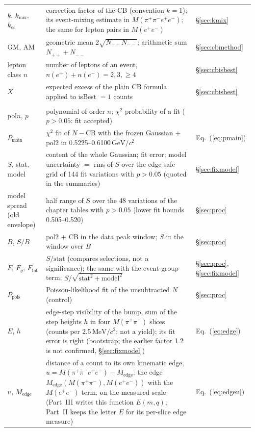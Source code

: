 \documentclass[11pt,a4paper]{article}
\newcommand{\Mfour}{\ensuremath{M(\pi^{+}\pi^{-}e^{+}e^{-})}\xspace}
\newcommand{\Mee}{\ensuremath{M(e^{+}e^{-})}\xspace}
\newcommand{\Mpipi}{\ensuremath{M(\pi^{+}\pi^{-})}\xspace}
\newcommand{\GeVcc}{\ensuremath{\mathrm{GeV}/c^{2}}\xspace}
\newcommand{\MeVcc}{\ensuremath{\mathrm{MeV}/c^{2}}\xspace}
\newcommand{\Pmain}{\ensuremath{P_{\mathrm{main}}}\xspace}
\newcommand{\Medge}{\ensuremath{M_{\mathrm{edge}}}}%
\begin{document}
{\begin{longtable}{@{}>{\raggedright\arraybackslash}p{3.0cm} >{\raggedright\arraybackslash}p{\dimexpr\textwidth-3.0cm-2.2cm-4\tabcolsep\relax} >{\raggedright\arraybackslash}p{2.2cm}@{}}
$k$, $k_{\mathrm{mix}}$, $k_{ee}$ & correction factor of the CB (convention $k=1$); its event-mixing estimate in \Mfour; the same for lepton pairs in \Mee & \S\ref{sec:kmix} \\
GM, AM & geometric mean $2\sqrt{N_{++}N_{--}}$; arithmetic sum $N_{++}+N_{--}$ & \S\ref{sec:cbmethod} \\
lepton class $n$ & number of leptons of an event, $n(e^+)+n(e^-)=2,3,\ge4$ & \S\ref{sec:cbisbest} \\
$X$ & expected excess of the plain CB formula applied to isBest $=1$ counts & \S\ref{sec:cbisbest} \\
\midrule
\multicolumn{3}{@{}l}{\textbf{Signal measures and their errors}} \\
pol$n$, $p$ & polynomial of order $n$; $\chi^2$ probability of a fit ($p>0.05$: fit accepted) & \\
\Pmain & $\chi^2$ fit of $N-\mathrm{CB}$ with the frozen Gaussian + pol2 in 0.5225--0.6100\,\GeVcc & Eq.~(\ref{eq:pmain}) \\
$S$, stat, model & content of the whole Gaussian; fit error; model uncertainty $=$ rms of $S$ over the edge-safe grid of 144 fit variations with $p>0.05$ (quoted in the summaries) & \S\ref{sec:fixmodel} \\
model spread (old envelope) & half range of $S$ over the 48 variations of the chapter tables with $p>0.05$ (lower fit bounds 0.505--0.520) & \S\ref{sec:proc} \\
$B$, $S/B$ & pol2 + CB in the data peak window; $S$ in the window over $B$ & \S\ref{sec:proc} \\
$F$, $F_g$, $F_{\mathrm{tot}}$ & $S/\mathrm{stat}$ (compares selections, not a significance); the same with the event-group term; $S/\sqrt{\mathrm{stat}^2+\mathrm{model}^2}$ & \S\ref{sec:proc}, \S\ref{sec:fixmodel} \\
$P_{\mathrm{pois}}$ & Poisson-likelihood fit of the unsubtracted $N$ (control) & \S\ref{sec:proc} \\
$E$, $h$ & edge-step visibility of the bump, sum of the step heights $h$ in four \Mpipi slices (counts per 2.5\,\MeVcc; not a yield); its fit error is right (bootstrap; the earlier factor 1.2 is not confirmed, \S\ref{sec:fixmodel}) & Eq.~(\ref{eq:edge}) \\
$u$, \Medge & distance of a count to its own kinematic edge, $u=\Mfour-\Medge$; the edge $\Medge(\Mpipi,\Mee)$ with the \Mee term, on the measured scale (Part~III writes this function $E(m,q)$; Part~II keeps the letter $E$ for its per-slice edge measure) & Eq.~(\ref{eq:edgeu}) \\

\end{longtable}}
\end{document}
